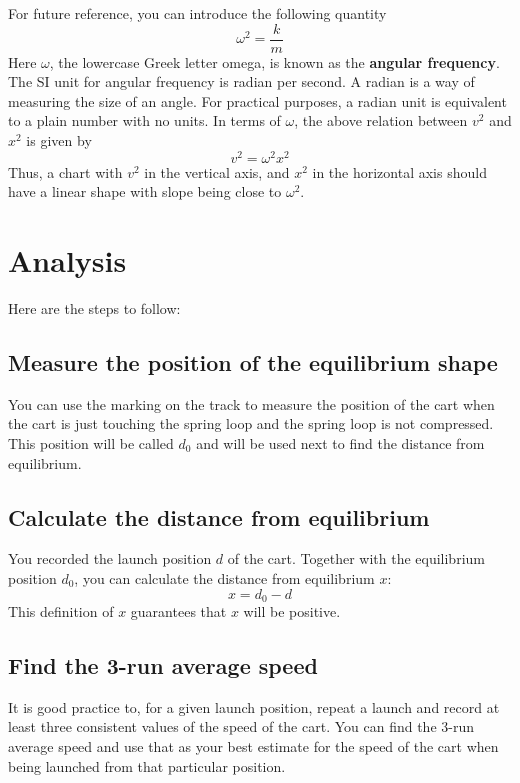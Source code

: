 For future reference, you can introduce the following quantity
\begin{equation}
    \omega^{2} = \frac{k}{m}
\end{equation}
Here $\omega$, the lowercase Greek letter omega, is known as the \textbf{angular frequency}. The SI unit for angular frequency is radian per second. A radian is a way of measuring the size of an angle. For practical purposes, a radian unit is equivalent to a plain number with no units. In terms of $\omega$, the above relation between $v^{2}$ and $x^{2}$ is given by
\begin{equation}
    v^{2} = \omega^{2} x^{2}
\end{equation}
Thus, a chart with $v^{2}$ in the vertical axis, and $x^{2}$ in the horizontal axis should have a linear shape with slope being close to $\omega^{2}$.
%
\section{Analysis}
%
Here are the steps to follow:
%
\subsection{Measure the position of the equilibrium shape}
%
You can use the marking on the track to measure the position of the cart when the cart is just touching the spring loop and the spring loop is not compressed. This position will be called $d_{0}$ and will be used next to find the distance from equilibrium.
%
\subsection{Calculate the distance from equilibrium}
%
You recorded the launch position $d$ of the cart. Together with the equilibrium position $d_{0}$, you can calculate the distance from equilibrium $x$:
\begin{equation}
    x = d_{0} - d
\end{equation}
This definition of $x$ guarantees that $x$ will be positive.
%
\subsection{Find the 3-run average speed}
%
It is good practice to, for a given launch position, repeat a launch and record at least three consistent values of the speed of the cart. You can find the 3-run average speed and use that as your best estimate for the speed of the cart when being launched from that particular position.
%
